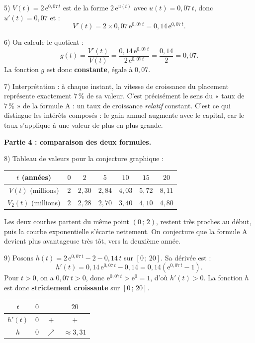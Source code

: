 \documentclass[11pt]{article}
\begin{document}
\begin{exoresolu}
5) $V(t) = 2\,\mathrm{e}^{0{,}07\,t}$ est de la forme $2\,\mathrm{e}^{u(t)}$ avec $u(t) = 0{,}07\,t$, donc $u'(t) = 0{,}07$ et :
\[ V'(t) = 2 \times 0{,}07\,\mathrm{e}^{0{,}07\,t} = 0{,}14\,\mathrm{e}^{0{,}07\,t}. \]

6) On calcule le quotient :
\[ g(t) = \frac{V'(t)}{V(t)} = \frac{0{,}14\,\mathrm{e}^{0{,}07\,t}}{2\,\mathrm{e}^{0{,}07\,t}} = \frac{0{,}14}{2} = 0{,}07. \]
La fonction $g$ est donc \textbf{constante}, égale à $0{,}07$.

7) Interprétation : à chaque instant, la vitesse de croissance du placement représente exactement $7\,\%$ de sa valeur. C'est précisément le sens du « taux de $7\,\%$ » de la formule A : un taux de croissance \emph{relatif} constant. C'est ce qui distingue les intérêts composés : le gain annuel augmente avec le capital, car le taux s'applique à une valeur de plus en plus grande.

\textbf{Partie 4 : comparaison des deux formules.}

8) Tableau de valeurs pour la conjecture graphique :
\begin{center}
\begin{tabular}{|c|cccccc|}
\hline
$t$ (années) & $0$ & $2$ & $5$ & $10$ & $15$ & $20$ \\
\hline
$V(t)$ (millions) & $2$ & $2{,}30$ & $2{,}84$ & $4{,}03$ & $5{,}72$ & $8{,}11$ \\
\hline
$V_2(t)$ (millions) & $2$ & $2{,}28$ & $2{,}70$ & $3{,}40$ & $4{,}10$ & $4{,}80$ \\
\hline
\end{tabular}
\end{center}
Les deux courbes partent du même point $(0\,;\,2)$, restent très proches au début, puis la courbe exponentielle s'écarte nettement. On conjecture que la formule A devient plus avantageuse très tôt, vers la deuxième année.

9) Posons $h(t) = 2\,\mathrm{e}^{0{,}07\,t} - 2 - 0{,}14\,t$ sur $[0\,;\,20]$. Sa dérivée est :
\[ h'(t) = 0{,}14\,\mathrm{e}^{0{,}07\,t} - 0{,}14 = 0{,}14\left(\mathrm{e}^{0{,}07\,t} - 1\right). \]
Pour $t > 0$, on a $0{,}07\,t > 0$, donc $\mathrm{e}^{0{,}07\,t} > \mathrm{e}^0 = 1$, d'où $h'(t) > 0$. La fonction $h$ est donc \textbf{strictement croissante} sur $[0\,;\,20]$.

\begin{center}
\begin{tabular}{|c|ccc|}
\hline
$t$ & $0$ & & $20$ \\
\hline
$h'(t)$ & $0$ & $+$ & $+$ \\
\hline
$h$ & $0$ & $\nearrow$ & $\approx 3{,}31$ \\
\hline
\end{tabular}
\end{center}


\end{exoresolu}
\end{document}
